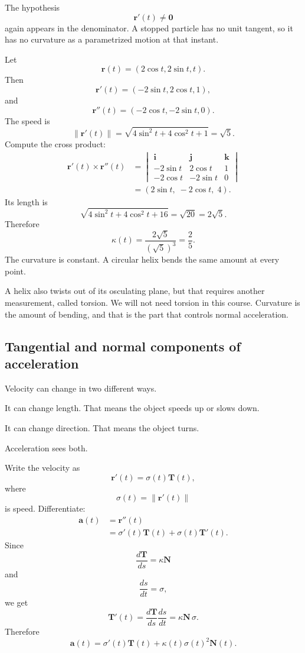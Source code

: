 The hypothesis
\[
    \mathbf r'(t)\ne\mathbf 0
\]
again appears in the denominator.  A stopped particle has no unit tangent, so it has no
curvature as a parametrized motion at that instant.

\begin{example}
Let
\[
    \mathbf r(t)=(2\cos t,2\sin t,t).
\]
Then
\[
    \mathbf r'(t)=(-2\sin t,2\cos t,1),
\]
and
\[
    \mathbf r''(t)=(-2\cos t,-2\sin t,0).
\]
The speed is
\[
    \|\mathbf r'(t)\|
    =
    \sqrt{4\sin^2t+4\cos^2t+1}
    =
    \sqrt5.
\]
Compute the cross product:
\[
\begin{aligned}
    \mathbf r'(t)\times\mathbf r''(t)
    &=
    \begin{vmatrix}
    \mathbf i & \mathbf j & \mathbf k\\
    -2\sin t & 2\cos t & 1\\
    -2\cos t & -2\sin t & 0
    \end{vmatrix}\\
    &=
    (2\sin t,\;-2\cos t,\;4).
\end{aligned}
\]
Its length is
\[
    \sqrt{4\sin^2t+4\cos^2t+16}
    =
    \sqrt{20}
    =
    2\sqrt5.
\]
Therefore
\[
    \kappa(t)
    =
    \frac{2\sqrt5}{(\sqrt5)^3}
    =
    \frac{2}{5}.
\]
The curvature is constant.  A circular helix bends the same amount at every point.
\end{example}

A helix also twists out of its osculating plane, but that requires another measurement,
called torsion.  We will not need torsion in this course.  Curvature is the amount of
bending, and that is the part that controls normal acceleration.

\subsection{Tangential and normal components of acceleration}

Velocity can change in two different ways.

It can change length.  That means the object speeds up or slows down.

It can change direction.  That means the object turns.

Acceleration sees both.

Write the velocity as
\[
    \mathbf r'(t)=\sigma(t)\mathbf T(t),
\]
where
\[
    \sigma(t)=\|\mathbf r'(t)\|
\]
is speed.  Differentiate:
\[
\begin{aligned}
    \mathbf a(t)
    &=
    \mathbf r''(t)\\
    &=
    \sigma'(t)\mathbf T(t)+\sigma(t)\mathbf T'(t).
\end{aligned}
\]
Since
\[
    \frac{d\mathbf T}{ds}=\kappa\mathbf N
\]
and
\[
    \frac{ds}{dt}=\sigma,
\]
we get
\[
    \mathbf T'(t)
    =
    \frac{d\mathbf T}{ds}\frac{ds}{dt}
    =
    \kappa\mathbf N\,\sigma.
\]
Therefore
\[
\boxed{
    \mathbf a(t)=\sigma'(t)\mathbf T(t)+\kappa(t)\sigma(t)^2\mathbf N(t).
}
\]

